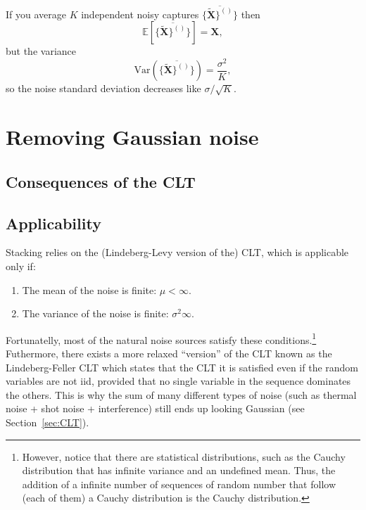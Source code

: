 If you average $K$ independent noisy captures
$\overline{\{\tilde{\bm{X}}\}^{()}\}}$ then
\begin{equation}
  \mathbb{E}[\overline{\{\tilde{\bm{X}}\}^{()}\}}]=\bm{X},
\end{equation}
but the variance
\begin{equation}
  \text{Var}(\overline{\{\tilde{\bm{X}}\}^{()}\}}) = \frac{\sigma^2}{K},
\end{equation}
so the noise standard deviation decreases like $\sigma/\sqrt{K}$.

\section{Removing Gaussian noise}
\subsection{Consequences of the \gls{CLT}}



\subsection{Applicability}

Stacking relies on the (Lindeberg-Levy version of the) \gls{CLT},
which is applicable only if:
\begin{enumerate}
\item The mean of the noise is finite: $\mu<\infty$.
\item The variance of the noise is finite: $\sigma^2\infty$.
\end{enumerate}
Fortunatelly, most of the natural noise sources satisfy these
conditions.\footnote{However, notice that there are statistical
  distributions, such as the Cauchy distribution that has infinite
  variance and an undefined mean. Thus, the addition of a infinite
  number of sequences of random number that follow (each of them) a
  Cauchy distribution is the Cauchy distribution.} Futhermore, there
exists a more relaxed ``version'' of the \gls{CLT} known as the
Lindeberg-Feller \gls{CLT} which states that the \gls{CLT} it is
satisfied even if the random variables are not \gls{iid}, provided
that no single variable in the sequence dominates the others. This is
why the sum of many different types of noise (such as thermal noise +
shot noise + interference) still ends up looking Gaussian (see
Section~\ref{sec:CLT}).

